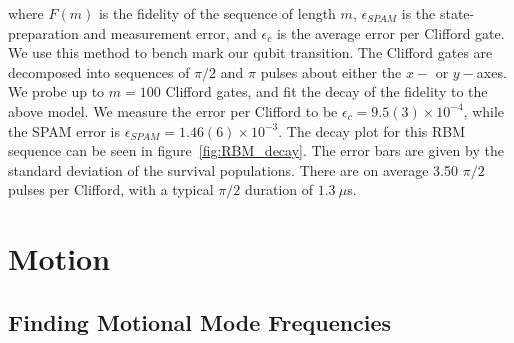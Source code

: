 \documentclass[12pt]{report}
\begin{document}
    \noindent where $F(m)$ is the fidelity of the sequence of length $m$,
    $\epsilon_{SPAM}$ is the state-preparation and measurement error, and
    $\epsilon_c$ is the average error per Clifford gate.  We use this method to
    bench mark our qubit transition. The Clifford gates are decomposed into
    sequences of $\pi/2$ and $\pi$ pulses about either the $x-$ or $y-$axes. We probe up to $m=100$ Clifford gates, and fit the decay of the fidelity to the above model.
    We measure the error per Clifford to be $\epsilon_c = 9.5(3) \times 10^{-4}$,
    while the SPAM error is $\epsilon_{SPAM} = 1.46(6) \times 10^{-3}$. The decay plot for
    this RBM sequence can be seen in figure~\ref{fig:RBM_decay}. The error bars
    are given by the standard deviation of the survival populations. There are on average 3.50 $\pi/2$ pulses per Clifford, with a typical $\pi/2$ duration of $1.3~\mu$s.\\


\section{Motion}
\label{sec:Motion}

\subsection{Finding Motional Mode Frequencies}
\end{document}
